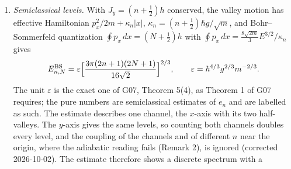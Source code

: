 \documentclass[11pt,a4paper]{article}
\newcommand{\tightlist}{\setlength{\itemsep}{0pt}\setlength{\parskip}{0pt}}
\begin{document}
\begin{enumerate}
  \begin{enumerate}
  \def\labelenumii{(\arabic{enumii})}
  \setcounter{enumii}{1982}
  \tightlist
  \item
    84--98, Theorem 1.4 and the display after Theorem 1.5, pp.~85--86,
    passage read). At \(\alpha=2\) this is
    \(N(E)\simeq\pi^{-1}E^{3/2}\ln E\), the growth also stated in Ann.
    Phys. 146, p.~212, end of Section 2. The dilation \(x\mapsto\ell x\)
    with \(\ell^6=\hbar^2/(mg^2)\) carries
    \(H=-\frac{\hbar^2}{2m}\Delta+\frac{g^2}{2}x^2y^2\) to
    \(\frac\varepsilon2(-\Delta+x^2y^2)\), because both coefficients
    become \(\hbar^2/(2m\ell^2)=g^2\ell^4/2=\varepsilon/2\). Hence
    \(N_H(E)\simeq(2\sqrt2/\pi)(E/\varepsilon)^{3/2}\ln(E/\varepsilon)\),
    while the floor count gives
    \(V(E)/h^2=(2\sqrt2/\pi)(E/\varepsilon)^{3/2}[\ln(E/\varepsilon)+\theta(E)]\).
    The leading terms agree, constant included. The identification
    \(N\approx V/h^2\) is the Weyl heuristic, and the agreement is a
    comparison of two computed leading terms; Simon's proof runs through
    a Feynman--Kac lower bound and sliced-bread upper bounds. Because
    the coefficient is independent of the floor value, the agreement
    tests that a positive area floor exists and leaves the number
    \(h/2\) untested. Simon (p.~86) calls a general geometric
    interpretation of the constant \(\pi^{-1}\) an open question; no
    search was run for later literature that supplies one, and no
    novelty is claimed.
  \end{enumerate}
\item
  \emph{Semiclassical levels.} With \(J_y=(n+\tfrac12)h\) conserved, the
  valley motion has effective Hamiltonian \(p_x^2/2m+\kappa_n|x|\),
  \(\kappa_n=(n+\tfrac12)\hbar g/\sqrt m\), and Bohr--Sommerfeld
  quantization \(\oint p_x\,dx=(N+\tfrac12)h\) with
  \(\oint p_x\,dx=\tfrac{8\sqrt{2m}}{3}E^{3/2}/\kappa_n\) gives
  \[E^{\rm BS}_{n,N}=\varepsilon\Big[\frac{3\pi(2n+1)(2N+1)}{16\sqrt2}\Big]^{2/3},
  \qquad\varepsilon=\hbar^{4/3}g^{2/3}m^{-2/3}.\] The unit
  \(\varepsilon\) is the exact one of G07, Theorem 5(4), as Theorem 1 of
  G07 requires; the pure numbers are semiclassical estimates of \(e_n\)
  and are labelled as such. The estimate describes one channel, the
  \(x\)-axis with its two half-valleys. The \(y\)-axis gives the same
  levels, so counting both channels doubles every level, and the
  coupling of the channels and of different \(n\) near the origin, where
  the adiabatic reading fails (Remark 2), is ignored (corrected
  2026-10-02). The estimate therefore shows a discrete spectrum with a

\end{enumerate}
\end{document}
